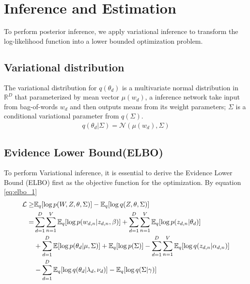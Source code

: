 \section{Inference and Estimation}
To perform posterior inference, we apply variational inference to transform the log-likelihood function into a lower bounded optimization problem.
\subsection{Variational distribution}
The variational distribution for $ q(\theta_d) $ is a multivariate normal distribution in $ \mathbb{R}^{D} $ that parameterized by mean vector $ \mu(w_d) $, a inference network take input from bag-of-words $ w_d $ and then outputs means from its weight parameters; $ \Sigma $ is a conditional variational parameter from $ q(\Sigma) $. 
\begin{align*}
q(\theta_d|\Sigma)=\mathcal{N}(\mu(w_d),\Sigma)
\end{align*}
\subsection{Evidence Lower Bound(ELBO)}\label{ch4:2} To perform Variational inference, it is essential to derive the Evidence Lower Bound (ELBO) first as the objective function for the optimization. By equation \ref{eq:elbo_1}
\begin{align}\label{eq:elbo_1}
\mathcal{L}\geq&\mathbb{E}_q[\log p(W,Z,\theta,\Sigma)]-\mathbb{E}_q[\log q(Z,\theta,\Sigma)]\notag\\
=&\sum_{d=1}^{D}\sum_{n=1}^{V}\mathbb{E}_q[\log p(w_{d,n}|z_{d,n},\beta)]+\sum_{d=1}^{D}\sum_{n=1}^{V}\mathbb{E}_q[\log p(z_{d,n}|\theta_d)]\notag\\
&+\sum_{d=1}^{D}\mathbb{E}[\log p(\theta_d|\mu,\Sigma)]+\mathbb{E}_q[\log p(\Sigma)]-\sum_{d=1}^{D}\sum_{n=1}^{V}\mathbb{E}_q[\log q(z_{d,n}|\alpha_{d,n})]\notag\\
&-\sum_{d=1}^{D}\mathbb{E}_q[\log q(\theta_d|\lambda_d,\nu_d)]-\mathbb{E}_q[\log q(\Sigma|\gamma)]
\end{align}
